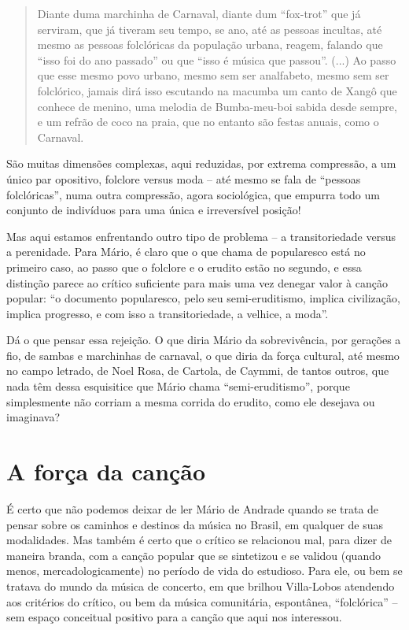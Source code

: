 \begin{quote}
Diante duma marchinha de Carnaval, diante dum ``fox-trot'' que já
serviram, que já tiveram seu tempo, se ano, até as pessoas incultas, até
mesmo as pessoas folclóricas da população urbana, reagem, falando que
``isso foi do ano passado'' ou que ``isso é música que passou''. (...)
Ao passo que esse mesmo povo urbano, mesmo sem ser analfabeto, mesmo sem
ser folclórico, jamais dirá isso escutando na macumba um canto de Xangô
que conhece de menino, uma melodia de Bumba-meu-boi sabida desde sempre,
e um refrão de coco na praia, que no entanto são festas anuais, como o
Carnaval.
\end{quote}

São muitas dimensões complexas, aqui reduzidas, por extrema compressão,
a um único par opositivo, folclore versus moda -- até mesmo se fala de
``pessoas folclóricas'', numa outra compressão, agora sociológica, que
empurra todo um conjunto de indivíduos para uma única e irreversível
posição!

Mas aqui estamos enfrentando outro tipo de problema -- a transitoriedade
versus a perenidade. Para Mário, é claro que o que chama de popularesco
está no primeiro caso, ao passo que o folclore e o erudito estão no
segundo, e essa distinção parece ao crítico suficiente para mais uma vez
denegar valor à canção popular: ``o documento popularesco, pelo seu
semi-eruditismo, implica civilização, implica progresso, e com isso a
transitoriedade, a velhice, a moda''.

Dá o que pensar essa rejeição. O que diria Mário da sobrevivência, por
gerações a fio, de sambas e marchinhas de carnaval, o que diria da força
cultural, até mesmo no campo letrado, de Noel Rosa, de Cartola, de
Caymmi, de tantos outros, que nada têm dessa esquisitice que Mário chama
``semi-eruditismo'', porque simplesmente não corriam a mesma corrida do
erudito, como ele desejava ou imaginava?

\chapter{A força da canção}

É certo que não podemos deixar de ler Mário de Andrade quando se trata
de pensar sobre os caminhos e destinos da música no Brasil, em qualquer
de suas modalidades. Mas também é certo que o crítico se relacionou mal,
para dizer de maneira branda, com a canção popular que se sintetizou e
se validou (quando menos, mercadologicamente) no período de vida do
estudioso. Para ele, ou bem se tratava do mundo da música de concerto,
em que brilhou Villa-Lobos atendendo aos critérios do crítico, ou bem da
música comunitária, espontânea, ``folclórica'' -- sem espaço conceitual
positivo para a canção que aqui nos interessou.

